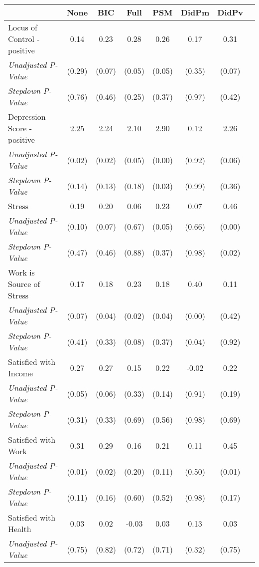 \begin{tabular}{l c c c c c c c}
\toprule
 & None & BIC & Full & PSM & DidPm & DidPv \\
\midrule
Locus of Control - positive & 0.14 & 0.23 & 0.28 & 0.26 & 0.17 & 0.31 \\
\quad \textit{Unadjusted P-Value} & (0.29) & (0.07) & (0.05) & (0.05) & (0.35) & (0.07) \\
\quad \textit{Stepdown P-Value} & (0.76) & (0.46) & (0.25) & (0.37) & (0.97) & (0.42) \\
Depression Score - positive & 2.25 & 2.24 & 2.10 & 2.90 & 0.12 & 2.26 \\
\quad \textit{Unadjusted P-Value} & (0.02) & (0.02) & (0.05) & (0.00) & (0.92) & (0.06) \\
\quad \textit{Stepdown P-Value} & (0.14) & (0.13) & (0.18) & (0.03) & (0.99) & (0.36) \\
Stress & 0.19 & 0.20 & 0.06 & 0.23 & 0.07 & 0.46 \\
\quad \textit{Unadjusted P-Value} & (0.10) & (0.07) & (0.67) & (0.05) & (0.66) & (0.00) \\
\quad \textit{Stepdown P-Value} & (0.47) & (0.46) & (0.88) & (0.37) & (0.98) & (0.02) \\
Work is Source of Stress & 0.17 & 0.18 & 0.23 & 0.18 & 0.40 & 0.11 \\
\quad \textit{Unadjusted P-Value} & (0.07) & (0.04) & (0.02) & (0.04) & (0.00) & (0.42) \\
\quad \textit{Stepdown P-Value} & (0.41) & (0.33) & (0.08) & (0.37) & (0.04) & (0.92) \\
Satisfied with Income & 0.27 & 0.27 & 0.15 & 0.22 & -0.02 & 0.22 \\
\quad \textit{Unadjusted P-Value} & (0.05) & (0.06) & (0.33) & (0.14) & (0.91) & (0.19) \\
\quad \textit{Stepdown P-Value} & (0.31) & (0.33) & (0.69) & (0.56) & (0.98) & (0.69) \\
Satisfied with Work & 0.31 & 0.29 & 0.16 & 0.21 & 0.11 & 0.45 \\
\quad \textit{Unadjusted P-Value} & (0.01) & (0.02) & (0.20) & (0.11) & (0.50) & (0.01) \\
\quad \textit{Stepdown P-Value} & (0.11) & (0.16) & (0.60) & (0.52) & (0.98) & (0.17) \\
Satisfied with Health & 0.03 & 0.02 & -0.03 & 0.03 & 0.13 & 0.03 \\
\quad \textit{Unadjusted P-Value} & (0.75) & (0.82) & (0.72) & (0.71) & (0.32) & (0.75) \\

\end{tabular}
